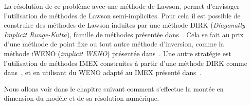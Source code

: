 La résolution de ce problème avec une méthode de Lawson, permet d'envisager l'utilisation de méthodes de Lawson semi-implicites. Pour cela il est possible de construire des méthodes de Lawson induites par une méthode DIRK (\emph{Diagonally Implicit Runge-Kutta}), famille de méthodes présentée dans~\cite{Alexander:1976}. Cela se fait au prix d'une méthode de point fixe ou tout autre méthode d'inversion, comme la méthode iWENO (\emph{implicit WENO}) présentée dans~\cite{Gottlieb:2006}. Une autre stratégie est l'utilisation de méthodes IMEX construites à partir d'une méthode DIRK comme dans~\cite{Cho:2021}, et en utilisant du WENO adapté au IMEX présenté dans~\cite{Boscarino:2019}.

Nous allons voir dans le chapitre suivant comment s'effectue la montée en dimension du modèle et de sa résolution numérique.
